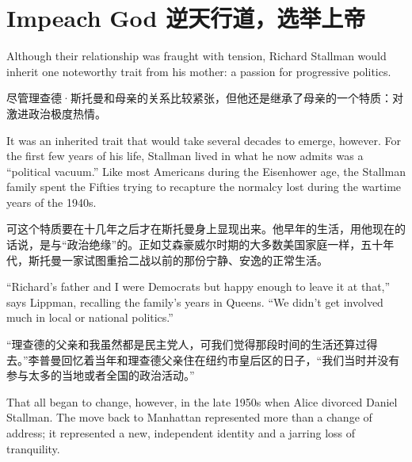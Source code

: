 
\chapter{\ifdefined\eng
Impeach God
\fi
\ifdefined\chs
逆天行道，选举上帝
\fi}

\ifdefined\eng
Although their relationship was fraught with tension, Richard Stallman would inherit one noteworthy trait from his mother: a passion for progressive politics.
\fi

\ifdefined\chs
尽管理查德·斯托曼和母亲的关系比较紧张，但他还是继承了母亲的一个特质：对激进政治极度热情。
\fi

\ifdefined\eng
It was an inherited trait that would take several decades to emerge, however. For the first few years of his life, Stallman lived in what he now admits was a ``political vacuum.'' Like most Americans during the Eisenhower age, the Stallman family spent the Fifties trying to recapture the normalcy lost during the wartime years of the 1940s.
\fi

\ifdefined\chs
可这个特质要在十几年之后才在斯托曼身上显现出来。他早年的生活，用他现在的话说，是与``政治绝缘''的。正如艾森豪威尔时期的大多数美国家庭一样，五十年代，斯托曼一家试图重拾二战以前的那份宁静、安逸的正常生活。
\fi

\ifdefined\eng
``Richard's father and I were Democrats but happy enough to leave it at that,'' says Lippman, recalling the family's years in Queens. ``We didn't get involved much in local or national politics.''
\fi

\ifdefined\chs
``理查德的父亲和我虽然都是民主党人，可我们觉得那段时间的生活还算过得去。''李普曼回忆着当年和理查德父亲住在纽约市皇后区的日子，``我们当时并没有参与太多的当地或者全国的政治活动。''
\fi

\ifdefined\eng
That all began to change, however, in the late 1950s when Alice divorced Daniel Stallman. The move back to Manhattan represented more than a change of address; it represented a new, independent identity and a jarring loss of tranquility.
\fi

